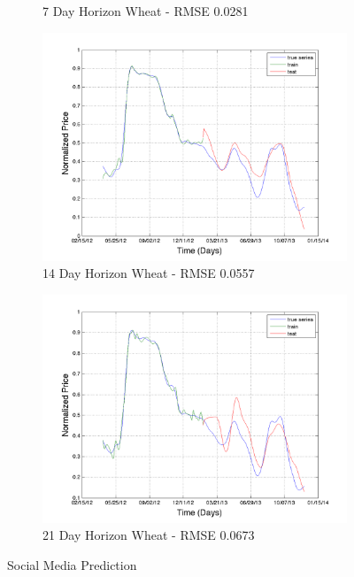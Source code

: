 \begin{figure}
\begin{subfigure}[b]{0.5\textwidth}
                \caption{7 Day Horizon Wheat - RMSE 0.0281}
                \label{fig:gull}
        \end{subfigure}%
              \hfill    
        \begin{subfigure}[b]{0.5\textwidth}
                \includegraphics[width=\textwidth]{img/model/wheat/model3_3/pred_14}
                \caption{14 Day Horizon Wheat - RMSE 0.0557  }
                \label{fig:tiger}
        \end{subfigure}%
              \begin{subfigure}[b]{0.5\textwidth}
                \includegraphics[width=\textwidth]{img/model/wheat/model3_3/pred_21}
                \caption{21 Day Horizon Wheat  - RMSE 0.0673 }
                \label{fig:tiger}
        \end{subfigure}%
        \caption{Social Media Prediction}\label{fig:last_test}
\end{figure}







